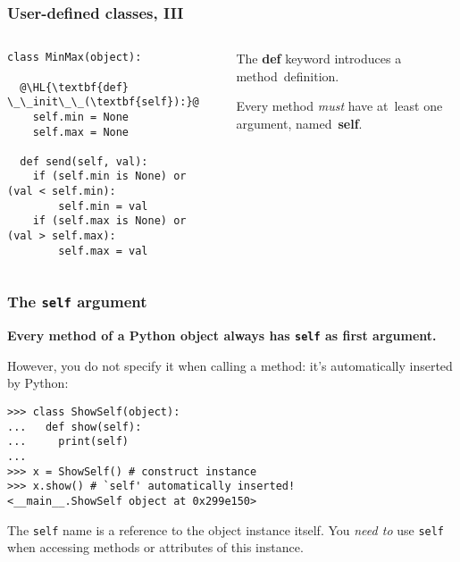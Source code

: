 \documentclass[english,serif,mathserif,xcolor=pdftex,dvipsnames,table]{beamer}
\begin{document}
\begin{frame}[fragile]
  \frametitle{User-defined classes, III}
  \begin{columns}[t]
    \begin{column}{0.5\textwidth}
\begin{lstlisting}
class MinMax(object):

  @\HL{\textbf{def} \_\_init\_\_(\textbf{self}):}@
    self.min = None
    self.max = None

  def send(self, val):
    if (self.min is None) or (val < self.min):
        self.min = val
    if (self.max is None) or (val > self.max):
        self.max = val
\end{lstlisting}
    \end{column}
    \begin{column}{0.5\textwidth}
      \raggedleft
      The {\bf def} keyword introduces a method~definition.

      \+
      Every method \emph{must} have at~least one argument,
      named~{\bf self}.
    \end{column}
  \end{columns}
\end{frame}


\begin{frame}[fragile]
  \frametitle{The \texttt{self} argument}

  \textbf{Every method of a Python object always has \texttt{self}
    as first argument.}

  \+
  However, you do not specify it when calling a method: it's
  automatically inserted by Python:
\begin{lstlisting}
>>> class ShowSelf(object):
...   def show(self):
...     print(self)
...
>>> x = ShowSelf() # construct instance
>>> x.show() # `self' automatically inserted!
<__main__.ShowSelf object at 0x299e150>
\end{lstlisting}

  \+
  The \texttt{self} name is a reference to the object instance
  itself.  You \emph{need to} use \texttt{self} when accessing methods
  or attributes of this instance.
\end{frame}
\end{document}
